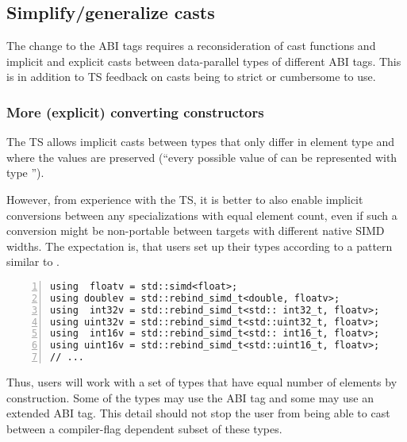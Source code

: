 \subsection{Simplify/generalize casts}\label{sec:casts}

The change to the ABI tags requires a reconsideration of cast functions and
implicit and explicit casts between data-parallel types of different ABI tags.
This is in addition to TS feedback on casts being to strict or cumbersome to use.

\subsubsection{More (explicit) converting constructors}

The TS allows implicit casts between  types that only
differ in element type and where the values are preserved (“every possible
value of  can be represented with type ”).

However, from experience with the TS, it is better to also enable implicit
conversions between any  specializations with equal element count,
even if such a conversion might be non-portable between targets with different
native SIMD widths.
The expectation is, that users set up their types according to a pattern
similar to .
\begin{lstlisting}[numbers=left,float={hbtp},label=lst:simdtypespattern,caption={
  Recommended setup of \code{simd} types
}]
using  floatv = std::simd<float>;
using doublev = std::rebind_simd_t<double, floatv>;
using  int32v = std::rebind_simd_t<std:: int32_t, floatv>;
using uint32v = std::rebind_simd_t<std::uint32_t, floatv>;
using  int16v = std::rebind_simd_t<std:: int16_t, floatv>;
using uint16v = std::rebind_simd_t<std::uint16_t, floatv>;
// ...
\end{lstlisting}
Thus, users will work with a set of types that have equal number of elements by
construction.
Some of the types may use the  ABI tag and some may use an
extended ABI tag.
This detail should not stop the user from being able to cast between a
compiler-flag dependent subset of these types.


